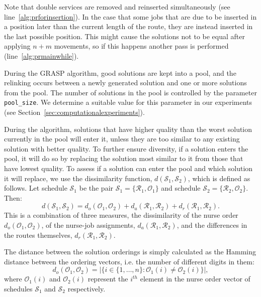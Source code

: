 \documentclass[a4paper,11pt,authoryear]{elsarticle}
\begin{document}
\noindent Note that double services are removed and reinserted simultaneously (see line~\ref{alg:prforinsertion}). In the case that some jobs that are due to be inserted in a position later than the current length of the route, they are instead inserted in the last possible position. This might cause the solutions not to be equal after applying $n + m$ movements, so if this happens another pass is performed (line~\ref{alg:prmainwhile}).

During the GRASP algorithm, good solutions are kept into a pool, and the relinking occurs between a newly generated solution and one or more solutions from the pool.
The number of solutions in the pool is controlled by the parameter \texttt{pool\_size}. We determine a suitable value for this parameter in our experiments (see Section~\ref{sec:computationalexperiments}).

During the algorithm, solutions that have higher quality than the worst solution currently in the pool will enter it, unless they are too similar to any existing solution with better quality. To further ensure diversity, if a solution enters the pool, it will do so by replacing the solution most similar to it from those that have lowest quality. To assess if a solution can enter the pool and which solution it will replace, we use the dissimilarity function, $d(\mathcal{S}_1, \mathcal{S}_2)$, which is defined as follows. Let schedule $\mathcal{S}_1$ be the pair $\mathcal{S}_1 = \{\mathcal{R}_1, \mathcal{O}_1\}$ and schedule $\mathcal{S}_2 = \{\mathcal{R}_2, \mathcal{O}_2\}$. Then:
\begin{equation}
    d(\mathcal{S}_1, \mathcal{S}_2) = d_o(\mathcal{O}_1, \mathcal{O}_2) + d_a(\mathcal{R}_1, \mathcal{R}_2) + d_r(\mathcal{R}_1, \mathcal{R}_2). \label{eq:dissimilarityfunction}
\end{equation}
This is a combination of three measures, the dissimilarity of the nurse order $d_o(\mathcal{O}_1, \mathcal{O}_2)$, of the nurse-job assignments, $d_a(\mathcal{R}_1, \mathcal{R}_2)$, and the differences in the routes themselves, $d_r(\mathcal{R}_1, \mathcal{R}_2)$.

The distance between the solution orderings is simply calculated as the Hamming distance between the ordering vectors, i.e. the number of different digits in them:
\begin{equation}
    d_o(\mathcal{O}_1, \mathcal{O}_2) = |\{i\in\{1,\dots,n\} : \mathcal{O}_1(i) \neq  \mathcal{O}_2(i)\}|, \label{eq:dissimilaritynurseorder}
\end{equation}
where $\mathcal{O}_1(i)$ and $\mathcal{O}_2(i)$ represent the $i^{th}$ element in the nurse order vector of schedules $\mathcal{S}_1$ and $\mathcal{S}_2$ respectively.
\end{document}
